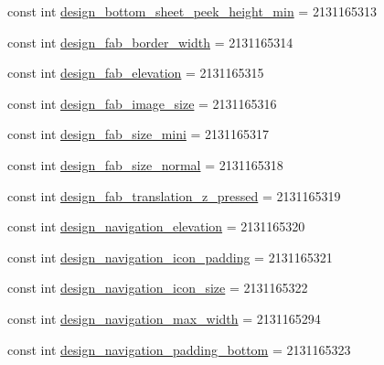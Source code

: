 \begin{DoxyCompactItemize}
\item 
const int \mbox{\hyperlink{class_f_w_p_s___app_1_1_droid_1_1_resource_1_1_dimension_aec89a81771bad4568ca9adb10207fc90}{design\+\_\+bottom\+\_\+sheet\+\_\+peek\+\_\+height\+\_\+min}} = 2131165313
\item 
const int \mbox{\hyperlink{class_f_w_p_s___app_1_1_droid_1_1_resource_1_1_dimension_a6652638f58381db9cced1a0946591ea4}{design\+\_\+fab\+\_\+border\+\_\+width}} = 2131165314
\item 
const int \mbox{\hyperlink{class_f_w_p_s___app_1_1_droid_1_1_resource_1_1_dimension_a2e4e3e21946a9e9d059cdf287a8d8416}{design\+\_\+fab\+\_\+elevation}} = 2131165315
\item 
const int \mbox{\hyperlink{class_f_w_p_s___app_1_1_droid_1_1_resource_1_1_dimension_a8ffe963e2e48dc1ed5125bf5076063f7}{design\+\_\+fab\+\_\+image\+\_\+size}} = 2131165316
\item 
const int \mbox{\hyperlink{class_f_w_p_s___app_1_1_droid_1_1_resource_1_1_dimension_a1cd6b625ba47cb191e9a29cf1d29610b}{design\+\_\+fab\+\_\+size\+\_\+mini}} = 2131165317
\item 
const int \mbox{\hyperlink{class_f_w_p_s___app_1_1_droid_1_1_resource_1_1_dimension_a819f15f8627834dbbbf42bd3e99af509}{design\+\_\+fab\+\_\+size\+\_\+normal}} = 2131165318
\item 
const int \mbox{\hyperlink{class_f_w_p_s___app_1_1_droid_1_1_resource_1_1_dimension_a79e518d1f803b56a3444197260fe0677}{design\+\_\+fab\+\_\+translation\+\_\+z\+\_\+pressed}} = 2131165319
\item 
const int \mbox{\hyperlink{class_f_w_p_s___app_1_1_droid_1_1_resource_1_1_dimension_a1b80a506a4f6fece4b4de5e99bbf4677}{design\+\_\+navigation\+\_\+elevation}} = 2131165320
\item 
const int \mbox{\hyperlink{class_f_w_p_s___app_1_1_droid_1_1_resource_1_1_dimension_a97f16896a2b69f2dee41e21c35d20b1d}{design\+\_\+navigation\+\_\+icon\+\_\+padding}} = 2131165321
\item 
const int \mbox{\hyperlink{class_f_w_p_s___app_1_1_droid_1_1_resource_1_1_dimension_a2bb0d1cfc1d2a6793745dbf40bba59e1}{design\+\_\+navigation\+\_\+icon\+\_\+size}} = 2131165322
\item 
const int \mbox{\hyperlink{class_f_w_p_s___app_1_1_droid_1_1_resource_1_1_dimension_acfd64d74a0a5ed718556912af94261c6}{design\+\_\+navigation\+\_\+max\+\_\+width}} = 2131165294
\item 
const int \mbox{\hyperlink{class_f_w_p_s___app_1_1_droid_1_1_resource_1_1_dimension_a5a860198aa96f15c63ea77cde4f943a2}{design\+\_\+navigation\+\_\+padding\+\_\+bottom}} = 2131165323

\end{DoxyCompactItemize}
